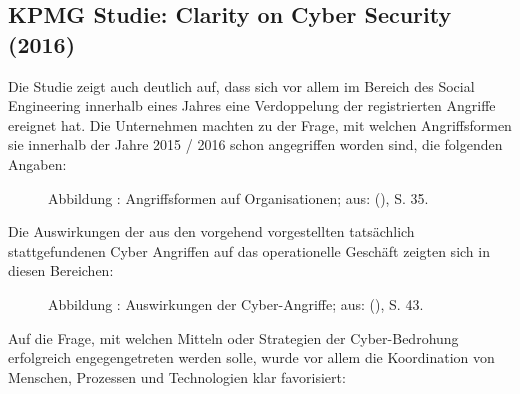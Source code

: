 \documentclass[../../main.tex]{subfiles}
\begin{document}
\subsection*{KPMG Studie: Clarity on Cyber Security (2016)}
\label{kpmg_study_2016}

Die Studie zeigt auch deutlich auf, dass sich vor allem im Bereich des Social Engineering innerhalb eines Jahres eine Verdoppelung der registrierten Angriffe ereignet hat. Die Unternehmen machten zu der Frage, mit welchen Angriffsformen sie innerhalb der Jahre 2015 / 2016 schon angegriffen worden sind, die folgenden Angaben:

\addtocounter{figure}{1}
\begin{figure}[H]
    
    \caption*{Abbildung \thefigure: Angriffsformen auf Organisationen; aus: \citeauthor{bossart_clarity_2016} (\citeyear{bossart_clarity_2016}), S. 35.}
    \label{fig:natureofattacks}
\end{figure}

Die Auswirkungen der aus den vorgehend vorgestellten tatsächlich stattgefundenen Cyber Angriffen auf das operationelle Geschäft zeigten sich in diesen Bereichen:

\addtocounter{figure}{1}
\begin{figure}[H]
    
    \vspace*{-5mm}
    \caption*{Abbildung \thefigure: Auswirkungen der Cyber-Angriffe; aus: \citeauthor{bossart_clarity_2016} (\citeyear{bossart_clarity_2016}), S. 43.}
    \label{fig:attackconsequences}
\end{figure}

Auf die Frage, mit welchen Mitteln oder Strategien der Cyber-Bedrohung erfolgreich engegengetreten werden solle, wurde vor allem die Koordination von Menschen, Prozessen und Technologien klar favorisiert:
\end{document}
